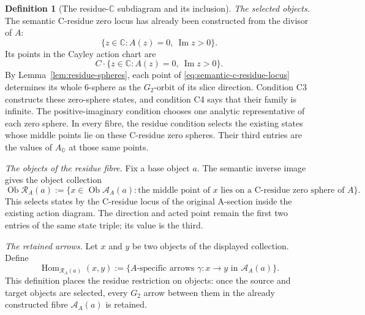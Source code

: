 \documentclass[11pt]{article}
\newcommand{\OO}{\mathbb{O}}
\newcommand{\CC}{\mathbb{C}}
\theoremstyle{plain}
\theoremstyle{definition}
\newtheorem{definition}[theorem]{Definition}
\theoremstyle{remark}
\begin{document}
\begin{definition}[The residue-$\CC$ subdiagram and its inclusion]
\emph{The selected objects.}
The semantic C-residue zero locus has already been constructed from the
divisor of $A$:
\[
 \{z\in\CC:A(z)=0,\ \operatorname{Im}z>0\}.
                                                        \tag{Z}\label{eq:semantic-c-residue-locus}
\]
Its points in the Cayley action chart are
\[
 C\mathbin{\cdot}
 \bigl\{z\in\CC:A(z)=0,\ \operatorname{Im}z>0\bigr\}.
\]
By Lemma~\ref{lem:residue-spheres}, each point of
\eqref{eq:semantic-c-residue-locus} determines its whole $6$-sphere as the
$G_2$-orbit of its slice direction. Condition \textup{C3} constructs these
zero-sphere states, and condition \textup{C4} says that their family is
infinite. The positive-imaginary condition chooses one analytic
representative of each zero sphere. In every fibre, the residue condition
selects the existing states whose middle points lie on these C-residue
zero spheres. Their third entries are the values of $A_{\OO}$ at those
same points.

\emph{The objects of the residue fibre.}
Fix a base object $a$. The semantic inverse image gives the object
collection
\[
 \operatorname{Ob}\mathcal R_A(a):=
 \bigl\{x\in\operatorname{Ob}\mathcal A_A(a):
   \text{the middle point of $x$ lies on a C-residue zero sphere of $A$}
 \bigr\}.
                                                        \tag{O}\label{eq:residue-fibre-objects}
\]
This selects states by the C-residue locus of the original A-section
inside the existing action diagram. The direction and acted point remain
the first two entries of the same state triple; its value is the third.

\emph{The retained arrows.}  Let $x$ and $y$ be
two objects of the displayed collection.  Define
\[
 \operatorname{Hom}_{\mathcal R_A(a)}(x,y)
 :=\bigl\{\text{$A$-specific arrows }\gamma:x\to y
          \text{ in }\mathcal A_A(a)\bigr\}.            \tag{H0}\label{eq:residue-hom-definition}
\]
This definition places the residue restriction on objects: once the source
and target objects are selected, every $G_2$ arrow between them in the
already constructed fibre $\mathcal A_A(a)$ is retained.


\end{definition}
\end{document}
